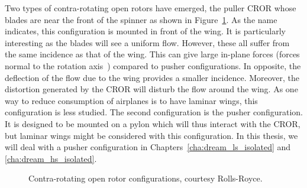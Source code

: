 Two types of contra-rotating open rotors have emerged, the
puller CROR whose blades are near the front of the spinner as 
shown in Figure~\ref{fig:cror_configurations}. As the
name indicates, this configuration is mounted in front of the
wing. It is particularly interesting as the blades will see
a uniform flow. However, these all suffer from the same incidence as that
of the wing. This can give large in-plane forces 
(forces normal to the rotation axis~\cite{ThesisFrancois}) compared to pusher
configurations. In opposite, the deflection of the flow due to the wing provides
a smaller incidence.
Moreover, the distortion generated
by the CROR will disturb the flow around the wing. As one way to reduce
consumption of airplanes is to have laminar wings, this configuration
is less studied. The second configuration is the pusher
configuration. It is designed to be mounted on a pylon which will thus
interact with the CROR, but laminar wings might be considered with
this configuration. In this thesis, we will deal with a pusher configuration
in Chapters~\ref{cha:dream_ls_isolated} and
\ref{cha:dream_hs_isolated}.
\begin{figure}[htp]
  \centering
  \caption{Contra-rotating open rotor configurations, courtesy Rolls-Royce.}
  \label{fig:cror_configurations}
\end{figure}

